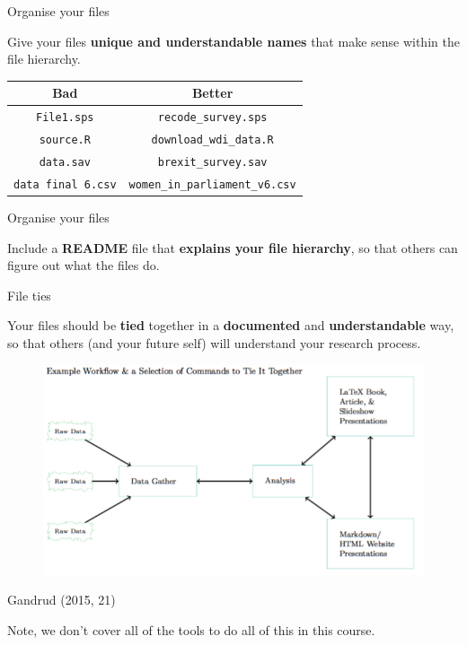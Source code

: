 \documentclass[10pt]{beamer}
\begin{document}
\begin{frame}{Organise your files}

    Give your files \textbf{unique and understandable names} that make sense within the file hierarchy.

    \begin{table}
        \begin{tabular}{c c}
        \hline
        Bad & Better \\
        \hline\hline
        \texttt{File1.sps} & \texttt{recode\_survey.sps} \\
        \texttt{source.R} & \texttt{download\_wdi\_data.R} \\
        \texttt{data.sav} & \texttt{brexit\_survey.sav} \\
        \texttt{data final 6.csv} & \texttt{women\_in\_parliament\_v6.csv} \\
        \hline
        \end{tabular}
    \end{table}

\end{frame}


\begin{frame}{Organise your files}

    Include a \textbf{README} file that \textbf{explains your file hierarchy}, so that others can figure out what the files do.

\end{frame}

\begin{frame}{File ties}

    Your files should be \textbf{tied} together in a \textbf{documented} and \textbf{understandable} way, so that others (and your future self) will understand your research process.

\end{frame}

\begin{frame}

    \begin{figure}
        \includegraphics[scale=0.35]{img/workflow.png}
    \end{figure}
{\tiny{Gandrud (2015, 21)}}


Note, we don't cover all of the tools to do all of this in this course.
\end{frame}
\end{document}
